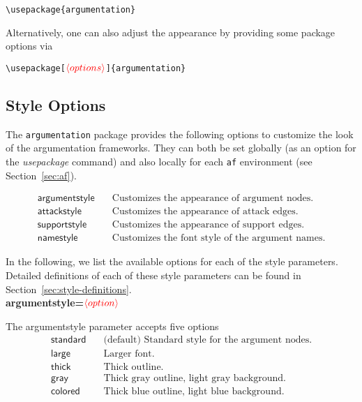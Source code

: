\documentclass[headings=normal]{scrartcl}
\newcommand{\argumentation}{\texttt{argumentation}\xspace}
\newcommand{\opt}[2][red]{\ensuremath{\textcolor{#1}{\langle #2\rangle}}}
\begin{document}
    \verb|\usepackage{argumentation}|

    \noindent
    Alternatively, one can also adjust the appearance by providing some package options via

    \verb|\usepackage[|\opt{options}\verb|]{argumentation}|


\subsection{Style Options}\label{sec:style}
    \begin{list}{}{\leftmargin=\parindent\rightmargin=0pt}
        \item The \argumentation package provides the following options to customize the look of the argumentation frameworks. They can both be set globally (as an option for the \emph{usepackage} command) and also locally for each \texttt{af} environment (see Section~\ref{sec:af}).
    \end{list}
    \vspace{-0.3cm}
    \begin{align*}
        \mathsf{argumentstyle} &\quad \text{Customizes the appearance of argument nodes.}\\
        \mathsf{attackstyle} &\quad \text{Customizes the appearance of attack edges.}\\
        \mathsf{supportstyle} &\quad \text{Customizes the appearance of support edges.}\\
        \mathsf{namestyle} &\quad \text{Customizes the font style of the argument names.}
    \end{align*}

    In the following, we list the available options for each of the style parameters.
    Detailed definitions of each of these style parameters can be found in Section~\ref{sec:style-definitions}.\\

{\bfseries\sffamily\noindent argumentstyle=\opt{option}}

    The \textsf{argumentstyle} parameter accepts five options
    \begin{align*}
        \mathsf{standard} &\quad \text{(default) Standard style for the argument nodes.}\\
        \mathsf{large} &\quad \text{Larger font.}\\
        \mathsf{thick} &\quad \text{Thick outline.}\\
        \mathsf{gray} &\quad \text{Thick gray outline, light gray background.}\\
        \mathsf{colored} &\quad \text{Thick blue outline, light blue background.}
    \end{align*}
\end{document}
